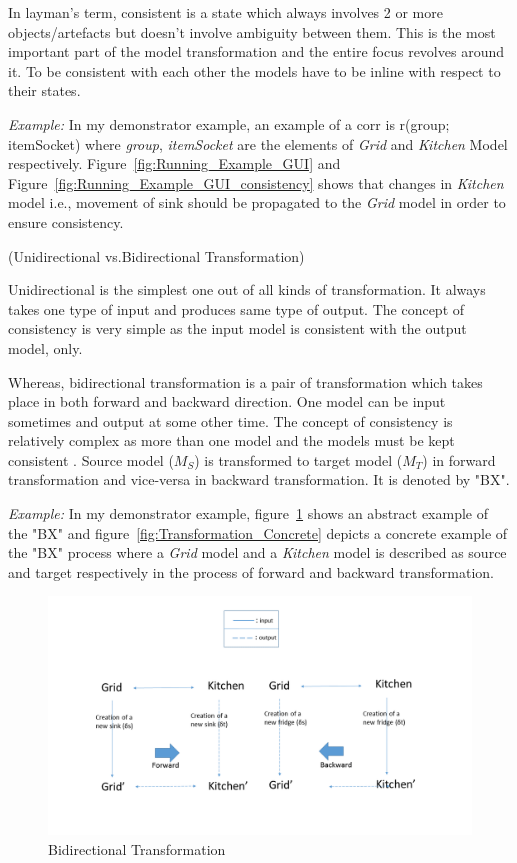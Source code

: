 In layman's term, consistent is a state which always involves 2 or more objects/artefacts but doesn't involve ambiguity between them. This is the most important part of the model transformation and the entire focus revolves around it. To be consistent with each other the models have to be inline with respect to their states. 

\textit{Example:} In my demonstrator example, an example of a corr is r(group; itemSocket) where \textit{group}, \textit{itemSocket} are the elements of \textit{Grid} and \textit{Kitchen} Model respectively. Figure~\ref{fig:Running_Example_GUI} and Figure~\ref{fig:Running_Example_GUI_consistency} shows that changes in \textit{Kitchen} model i.e., movement of sink should be propagated to the \textit{Grid} model in order to ensure consistency.\\

\begin{defn}\label{defunivsbi} (Unidirectional vs.Bidirectional Transformation) \end{defn}
Unidirectional is the simplest one out of all kinds of transformation. It always takes one type of input and produces same type of output. The concept of consistency is very simple as the input model is consistent with the output model, only.

Whereas, bidirectional transformation is a pair of transformation which takes place in both forward and backward direction. One model can be input sometimes and output at some other time. The concept of consistency is relatively complex as more than one model and the models must be kept consistent \cite{understanding-bx}. Source model ($M_{S}$) is transformed to target model ($M_{T}$) in forward transformation and vice-versa in backward transformation. It is denoted by "BX". 

\textit{Example:} In my demonstrator example, figure~\ref{fig:BX_Diagram} shows an abstract example of the "BX" and figure~\ref{fig:Transformation_Concrete} depicts a concrete example of the "BX" process where a \textit{Grid} model and a \textit{Kitchen} model is described as source and target respectively in the process of forward and backward transformation.

\begin{figure}
	\includegraphics[width=1\textwidth]{figures/BX}
	\caption{Bidirectional Transformation}
	\label{fig:BX_Diagram}
\end{figure}